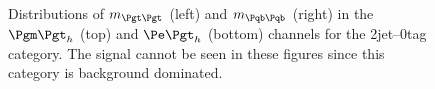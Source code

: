 \begin{figure}
\begin{center}

\end{center}
\caption[Distributions of $m_{\Pgt\Pgt}$ (left) and $m_{\Pqb\Pqb}$ (right) in the $\mutau$ (top) and
$\etau$ (bottom) channels for the 2jet--0tag category.]{
Distributions of $m_{\Pgt\Pgt}$ (left) and $m_{\Pqb\Pqb}$ (right) in the $\mutau$ (top) and
$\etau$ (bottom) channels for the 2jet--0tag category. The signal cannot be seen
in these figures since this category is background dominated.}
\label{fig:2jet0tagmttmbb}
\end{figure} 

